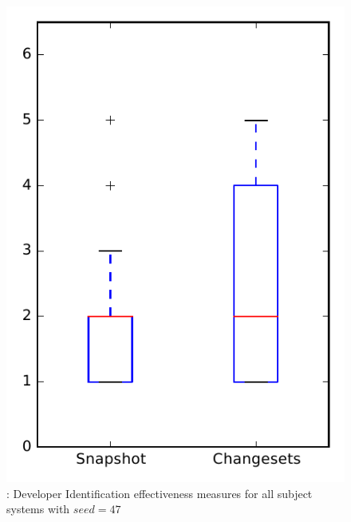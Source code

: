 
\begin{figure}
\centering
\includegraphics[height=0.4\textheight]{figures/dit_seed/rq1_overview_47}
\caption{\rtwo: Developer Identification effectiveness measures for all subject systems with $seed=47$}
\label{fig:dit_seed:rq1:overview}
\end{figure}
